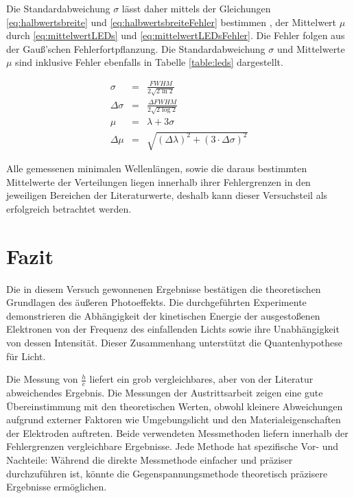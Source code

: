 \documentclass[12pt,a4paper]{scrartcl}
\numberwithin{equation}{section} %
\begin{document}
Die Standardabweichung $\sigma$ lässt daher mittels der Gleichungen \eqref{eq:halbwertsbreite} und \eqref{eq:halbwertsbreiteFehler} bestimmen \cite{Halbwertsbreite}, der Mittelwert $\mu$ durch \eqref{eq:mittelwertLEDs} und \eqref{eq:mittelwertLEDsFehler}. Die Fehler folgen aus der Gauß'schen Fehlerfortpflanzung. Die Standardabweichung $\sigma$ und Mittelwerte $\mu$ sind inklusive Fehler ebenfalls in Tabelle \ref{table:leds} dargestellt.

\begin{eqnarray}
	\sigma &=& \frac{FWHM}{2 \sqrt{2 \ln{2}}}
	\label{eq:halbwertsbreite} \\
	\Delta \sigma &=& \frac{\Delta FWHM}{2 \sqrt{2 \log{2}}}
	\label{eq:halbwertsbreiteFehler} \\
	\mu &=& \lambda + 3 \sigma
	\label{eq:mittelwertLEDs} \\
	\Delta \mu &=& \sqrt{\left(\Delta \lambda\right)^2 + \left(3 \cdot \Delta \sigma \right)^2}
	\label{eq:mittelwertLEDsFehler}
\end{eqnarray}

\noindent
Alle gemessenen minimalen Wellenlängen, sowie die daraus bestimmten Mittelwerte der Verteilungen liegen innerhalb ihrer Fehlergrenzen in den jeweiligen Bereichen der Literaturwerte, deshalb kann dieser Versuchsteil als erfolgreich betrachtet werden.

\clearpage
\hypertarget{fazit}{%
\section{Fazit}\label{fazit}}
Die in diesem Versuch gewonnenen Ergebnisse bestätigen die theoretischen Grundlagen des äußeren Photoeffekts. Die durchgeführten Experimente demonstrieren die Abhängigkeit der kinetischen Energie der ausgestoßenen Elektronen von der Frequenz des einfallenden Lichts sowie ihre Unabhängigkeit von dessen Intensität. Dieser Zusammenhang unterstützt die Quantenhypothese für Licht.

Die Messung von $\frac{h}{e}$ liefert ein grob vergleichbares, aber von der Literatur abweichendes Ergebnis. Die Messungen der Austrittsarbeit zeigen eine gute Übereinstimmung mit den theoretischen Werten, obwohl kleinere Abweichungen aufgrund externer Faktoren wie Umgebungslicht und den Materialeigenschaften der Elektroden auftreten. Beide verwendeten Messmethoden liefern innerhalb der Fehlergrenzen vergleichbare Ergebnisse. Jede Methode hat spezifische Vor- und Nachteile: Während die direkte Messmethode einfacher und präziser durchzuführen ist, könnte die Gegenspannungsmethode theoretisch präzisere Ergebnisse ermöglichen.
\end{document}
